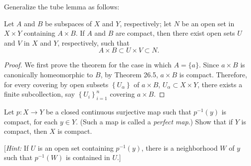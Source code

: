 \newpage
\begin{problem}[Munkres \S26, Ex.\,9]
Generalize the tube lemma as follows:
\begin{theorem*}
Let $A$ and $B$ be subspaces of $X$ and $Y$, respectively; let
$N$ be an open set in $X\times Y$ containing $A\times B$. If $A$
and $B$ are compact, then there exist open sets $U$ and $V$ in
$X$ and $Y$, respectively, such that
\[A\times B\subset U\times V\subset N.\]
\end{theorem*}
\end{problem}
\begin{proof}
We first prove the theorem for the case in which $A=\{a\}$. Since
$a\times B$ is canonically homeomorphic to $B$, by Theorem 26.5,
$a\times B$ is compact. Therefore, for every covering by open
subsets $\left\{ U_\alpha \right\}$ of $a\times B$,
$U_\alpha\subset X\times Y$, there exists a finite subcollection,
say $\left\{ U_i \right\}_{i=1}^n$ covering $a\times B$.


\end{proof}
\newpage
\begin{problem}[Munkres \S26, Ex.\,12]
Let $p\colon X\to Y$ be a closed continuous surjective map
such that $p^{-1}(y)$ is compact, for each $y\in Y$. (Such a
map is called a \emph{perfect map}.) Show that if $Y$ is compact,
then $X$ is compact.

[\emph{Hint:} If $U$ is an open set containing $p^{-1}(y)$, there
is a neighborhood $W$ of $y$ such that $p^{-1}(W)$ is contained
in $U$.]
\end{problem}
